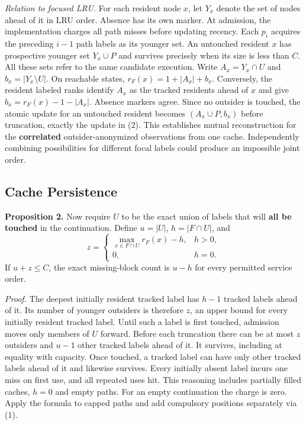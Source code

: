 \documentclass[11pt,letterpaper]{article}
\begin{document}
\noindent\textit{Relation to focused LRU.} For each resident node $x$, let $Y_x$ denote the set of nodes ahead of it in LRU order. Absence has its own marker. At admission, the implementation charges all path misses before updating recency. Each $p_i$ acquires the preceding $i-1$ path labels as its younger set. An untouched resident $x$ has prospective younger set $Y_x\cup P$ and survives precisely when its size is less than $C$. All these sets refer to the same candidate execution. Write $A_x=Y_x\cap U$ and $b_x=|Y_x\setminus U|$. On reachable states, $r_F(x)=1+|A_x|+b_x$. Conversely, the resident labeled ranks identify $A_x$ as the tracked residents ahead of $x$ and give $b_x=r_F(x)-1-|A_x|$. Absence markers agree. Since no outsider is touched, the atomic update for an untouched resident becomes $(A_x\cup P,b_x)$ before truncation, exactly the update in (2). This establishes mutual reconstruction for the \textbf{correlated} outsider-anonymized observations from one cache. Independently combining possibilities for different focal labels could produce an impossible joint order.

\subsection{Cache Persistence}

\textbf{Proposition 2.} Now require $U$ to be the exact union of labels that will \textbf{all be touched} in the continuation. Define $u=|U|$, $h=|F\cap U|$, and
\[
 z=
 \begin{cases}
 \max_{x\in F\cap U} r_F(x)-h,&h>0,\\
 0,&h=0 .
 \end{cases}
\]
If $u+z\le C$, the exact missing-block count is $u-h$ for every permitted service order.

\emph{Proof.} The deepest initially resident tracked label has $h-1$ tracked labels ahead of it. Its number of younger outsiders is therefore $z$, an upper bound for every initially resident tracked label. Until such a label is first touched, admission moves only members of $U$ forward. Before each truncation there can be at most $z$ outsiders and $u-1$ other tracked labels ahead of it. It survives, including at equality with capacity. Once touched, a tracked label can have only other tracked labels ahead of it and likewise survives. Every initially absent label incurs one miss on first use, and all repeated uses hit. This reasoning includes partially filled caches, $h=0$ and empty paths. For an empty continuation the charge is zero. Apply the formula to capped paths and add compulsory positions separately via (1).
\end{document}
